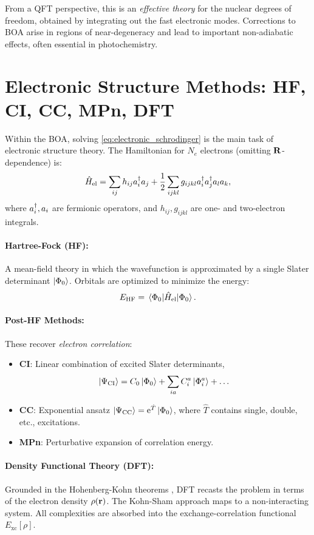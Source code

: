 From a QFT perspective, this is an \emph{effective theory} for the nuclear degrees of freedom, obtained by integrating out the fast electronic modes. Corrections to BOA arise in regions of near-degeneracy and lead to important non-adiabatic effects, often essential in photochemistry.

\section{Electronic Structure Methods: HF, CI, CC, MPn, DFT}
\label{sec:qc_electronic_structure}

Within the BOA, solving \cref{eq:electronic_schrodinger} is the main task of electronic structure theory. The Hamiltonian for \(N_e\) electrons (omitting \(\vb{R}\)-dependence) is:
\begin{equation}
	\hat{H}_{\text{el}} = \sum_{ij} h_{ij} a^\dagger_{i} a_{j} + \frac{1}{2} \sum_{ijkl} g_{ijkl} a^\dagger_{i} a^\dagger_{j} a_{l} a_{k},
	\label{eq:Hel_2ndQ}
\end{equation}
where \(a^\dagger_{i}, a_{i}\) are fermionic operators, and \(h_{ij}, g_{ijkl}\) are one- and two-electron integrals.

\paragraph{Hartree-Fock (HF):}
A mean-field theory in which the wavefunction is approximated by a single Slater determinant \(\ket{\Phi_0}\). Orbitals are optimized to minimize the energy:
\[
E_{\text{HF}} = \mel{\Phi_0}{\hat{H}_{\text{el}}}{\Phi_0}.
\]

\paragraph{Post-HF Methods:}
These recover \emph{electron correlation}:
\begin{itemize}
	\item \textbf{CI}: Linear combination of excited Slater determinants,
	\[
	\ket{\Psi_{\text{CI}}} = C_0 \ket{\Phi_0} + \sum_{ia} C_i^a \ket{\Phi_i^a} + \dots
	\]
	\item \textbf{CC}: Exponential ansatz \(\ket{\Psi_{\text{CC}}} = \mathrm{e}^{\hat{T}} \ket{\Phi_0}\), where \(\hat{T}\) contains single, double, etc., excitations.
	\item \textbf{MPn}: Perturbative expansion of correlation energy.
\end{itemize}

\paragraph{Density Functional Theory (DFT):}
Grounded in the Hohenberg-Kohn theorems \cite{Hohenberg1964}, DFT recasts the problem in terms of the electron density \(\rho(\vb{r})\). The Kohn-Sham approach maps to a non-interacting system. All complexities are absorbed into the exchange-correlation functional \(E_{\text{xc}}[\rho]\).

